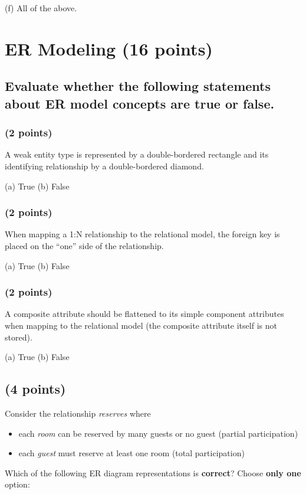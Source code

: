 \documentclass[11pt,a4paper]{article}
\begin{document}
(f) All of the above.

\newpage

\section{ER Modeling (16 points)}

\subsection{Evaluate whether the following statements about ER model concepts are true or false.}

\subsubsection{(2 points)}
A weak entity type is represented by a double-bordered rectangle and its identifying relationship by a double-bordered diamond.

(a) True \quad\quad (b) False

\subsubsection{(2 points)}
When mapping a 1:N relationship to the relational model, the foreign key is placed on the ``one'' side of the relationship.

(a) True \quad\quad (b) False

\subsubsection{(2 points)}
A composite attribute should be flattened to its simple component attributes when mapping to the relational model (the composite attribute itself is not stored).

(a) True \quad\quad (b) False

\subsection{(4 points)}
Consider the relationship \textit{reserves} where
\begin{itemize}
\item each \textit{room} can be reserved by many guests or no guest (partial participation)
\item each \textit{guest} must reserve at least one room (total participation)
\end{itemize}

Which of the following ER diagram representations is \textbf{correct}? Choose \textbf{only one} option:
\end{document}
